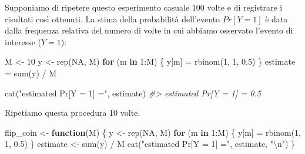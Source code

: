 \documentclass[
  11pt,
]{krantz}
\makeatletter
\newenvironment{Shaded}{\begin{snugshade}}{\end{snugshade}}
\newcommand{\CommentTok}[1]{\textcolor[rgb]{0.37,0.37,0.37}{\textit{#1}}}
\newcommand{\ConstantTok}[1]{\textcolor[rgb]{0,0,0}{#1}}
\newcommand{\ControlFlowTok}[1]{\textcolor[rgb]{0.27,0.27,0.27}{\textbf{#1}}}
\newcommand{\DecValTok}[1]{\textcolor[rgb]{0.06,0.06,0.06}{#1}}
\newcommand{\FloatTok}[1]{\textcolor[rgb]{0.06,0.06,0.06}{#1}}
\newcommand{\FunctionTok}[1]{\textcolor[rgb]{0,0,0}{#1}}
\newcommand{\NormalTok}[1]{#1}
\newcommand{\OtherTok}[1]{\textcolor[rgb]{0.37,0.37,0.37}{#1}}
\newcommand{\SpecialCharTok}[1]{\textcolor[rgb]{0,0,0}{#1}}
\newcommand{\StringTok}[1]{\textcolor[rgb]{0.5,0.5,0.5}{#1}}
\newenvironment{kframe}{%
\medskip{}
\setlength{\fboxsep}{.8em}
 \def\at@end@of@kframe{}%
 \ifinner\ifhmode%
  \def\at@end@of@kframe{\end{minipage}}%
  \begin{minipage}{\columnwidth}%
 \fi\fi%
 \def\FrameCommand##1{\hskip\@totalleftmargin \hskip-\fboxsep
 \colorbox{shadecolor}{##1}\hskip-\fboxsep
     \hskip-\linewidth \hskip-\@totalleftmargin \hskip\columnwidth}%
 \MakeFramed {\advance\hsize-\width
   \@totalleftmargin\z@ \linewidth\hsize
   \@setminipage}}%
 {\par\unskip\endMakeFramed%
 \at@end@of@kframe}
\renewenvironment{Shaded}{\begin{kframe}}{\end{kframe}}
\theoremstyle{definition}
\theoremstyle{definition}
\theoremstyle{definition}
\theoremstyle{definition}
\theoremstyle{remark}
\makeatother
\begin{document}
Supponiamo di ripetere questo esperimento casuale 100 volte e di registrare i risultati così ottenuti. La stima della probabilità dell'evento \(Pr[Y = 1]\) è data dalla frequenza relativa del numero di volte in cui abbiamo osservato l'evento di interesse (\(Y = 1\)):

\begin{Shaded}
\begin{Highlighting}[]
\NormalTok{M }\OtherTok{\textless{}{-}} \DecValTok{10}
\NormalTok{y }\OtherTok{\textless{}{-}} \FunctionTok{rep}\NormalTok{(}\ConstantTok{NA}\NormalTok{, M)}
\ControlFlowTok{for}\NormalTok{ (m }\ControlFlowTok{in} \DecValTok{1}\SpecialCharTok{:}\NormalTok{M) \{}
\NormalTok{  y[m] }\OtherTok{=} \FunctionTok{rbinom}\NormalTok{(}\DecValTok{1}\NormalTok{, }\DecValTok{1}\NormalTok{, }\FloatTok{0.5}\NormalTok{)}
\NormalTok{\}}
\NormalTok{estimate }\OtherTok{=} \FunctionTok{sum}\NormalTok{(y) }\SpecialCharTok{/}\NormalTok{ M}

\FunctionTok{cat}\NormalTok{(}\StringTok{"estimated Pr[Y = 1] ="}\NormalTok{, estimate)}
\CommentTok{\#\textgreater{} estimated Pr[Y = 1] = 0.5}
\end{Highlighting}
\end{Shaded}

\noindent Ripetiamo questa procedura 10 volte.

\begin{Shaded}
\begin{Highlighting}[]
\NormalTok{flip\_coin }\OtherTok{\textless{}{-}} \ControlFlowTok{function}\NormalTok{(M) \{}
\NormalTok{  y }\OtherTok{\textless{}{-}} \FunctionTok{rep}\NormalTok{(}\ConstantTok{NA}\NormalTok{, M)}
  \ControlFlowTok{for}\NormalTok{ (m }\ControlFlowTok{in} \DecValTok{1}\SpecialCharTok{:}\NormalTok{M) \{}
\NormalTok{    y[m] }\OtherTok{=} \FunctionTok{rbinom}\NormalTok{(}\DecValTok{1}\NormalTok{, }\DecValTok{1}\NormalTok{, }\FloatTok{0.5}\NormalTok{)}
\NormalTok{  \}}
\NormalTok{  estimate }\OtherTok{\textless{}{-}} \FunctionTok{sum}\NormalTok{(y) }\SpecialCharTok{/}\NormalTok{ M}
  \FunctionTok{cat}\NormalTok{(}\StringTok{"estimated Pr[Y = 1] ="}\NormalTok{, estimate, }\StringTok{"}\SpecialCharTok{\textbackslash{}n}\StringTok{"}\NormalTok{)}
\NormalTok{\}}
\end{Highlighting}
\end{Shaded}
\end{document}

